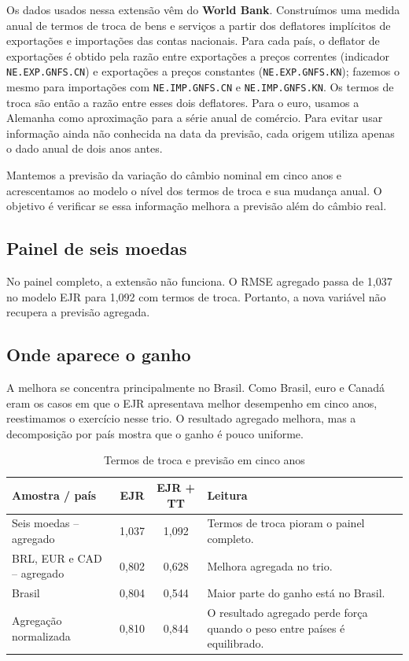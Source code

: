 \documentclass[11pt,a4paper]{article}
\begin{document}
Os dados usados nessa extensão vêm do \textbf{World Bank}. Construímos uma medida anual de termos de troca de bens e serviços a partir dos deflatores implícitos de exportações e importações das contas nacionais. Para cada país, o deflator de exportações é obtido pela razão entre exportações a preços correntes (indicador \texttt{NE.EXP.GNFS.CN}) e exportações a preços constantes (\texttt{NE.EXP.GNFS.KN}); fazemos o mesmo para importações com \texttt{NE.IMP.GNFS.CN} e \texttt{NE.IMP.GNFS.KN}. Os termos de troca são então a razão entre esses dois deflatores. Para o euro, usamos a Alemanha como aproximação para a série anual de comércio. Para evitar usar informação ainda não conhecida na data da previsão, cada origem utiliza apenas o dado anual de dois anos antes.

Mantemos a previsão da variação do câmbio nominal em cinco anos e acrescentamos ao modelo o nível dos termos de troca e sua mudança anual. O objetivo é verificar se essa informação melhora a previsão além do câmbio real.

\subsection{Painel de seis moedas}

No painel completo, a extensão não funciona. O RMSE agregado passa de 1,037 no modelo EJR para 1,092 com termos de troca. Portanto, a nova variável não recupera a previsão agregada.

\subsection{Onde aparece o ganho}

A melhora se concentra principalmente no Brasil. Como Brasil, euro e Canadá eram os casos em que o EJR apresentava melhor desempenho em cinco anos, reestimamos o exercício nesse trio. O resultado agregado melhora, mas a decomposição por país mostra que o ganho é pouco uniforme.

\begin{table}[htbp]
\centering
\caption{Termos de troca e previsão em cinco anos}
\begin{tabular}{p{4.2cm}ccp{6.0cm}}
\toprule
\textbf{Amostra / país} & \textbf{EJR} & \textbf{EJR + TT} & \textbf{Leitura} \\
\midrule
Seis moedas -- agregado & 1,037 & 1,092 & Termos de troca pioram o painel completo. \\
BRL, EUR e CAD -- agregado & 0,802 & 0,628 & Melhora agregada no trio. \\
Brasil & 0,804 & 0,544 & Maior parte do ganho está no Brasil. \\
Agregação normalizada & 0,810 & 0,844 & O resultado agregado perde força quando o peso entre países é equilibrado. \\
\bottomrule
\end{tabular}
\end{table}
\end{document}
